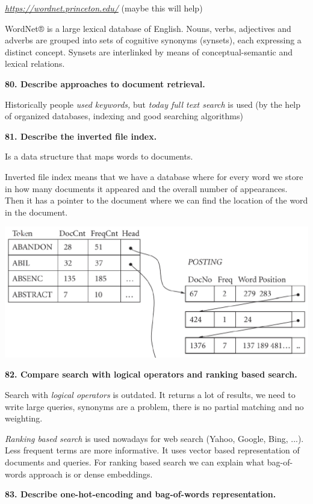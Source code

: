 \href{https://wordnet.princeton.edu/}{\textit{https://wordnet.princeton.edu/}}
(maybe this will help)

WordNet® is a large lexical database of English. Nouns, verbs,
adjectives and adverbs are grouped into sets of cognitive synonyms
(synsets), each expressing a distinct concept. Synsets are interlinked
by means of conceptual-semantic and lexical relations.

\textbf{80. Describe approaches to document retrieval.}

Historically people \textit{used keywords,} but \textit{today
\emph{full text search}} is used (by the help of organized databases,
indexing and good searching algorithms)

\textbf{81. Describe the inverted file index.}

Is a data structure that maps words to documents.

Inverted file index means that we have a database where for every word
we store in how many documents it appeared and the overall number of
appearances. Then it has a pointer to the document where we can find the
location of the word in the document.

\includegraphics[width=\columnwidth]{media/image10.png}

\textbf{82. Compare search with logical operators and ranking based
search.}

Search with \textit{logical operators} is outdated. It returns a lot
of results, we need to write large queries, synonyms are a problem,
there is no partial matching and no weighting.

\textit{Ranking based search} is used nowadays for web search (Yahoo,
Google, Bing, ...). Less frequent terms are more informative. It uses
vector based representation of documents and queries. For ranking based
search we can explain what bag-of-words approach is or dense embeddings.

\textbf{83. Describe one-hot-encoding and bag-of-words representation.}

